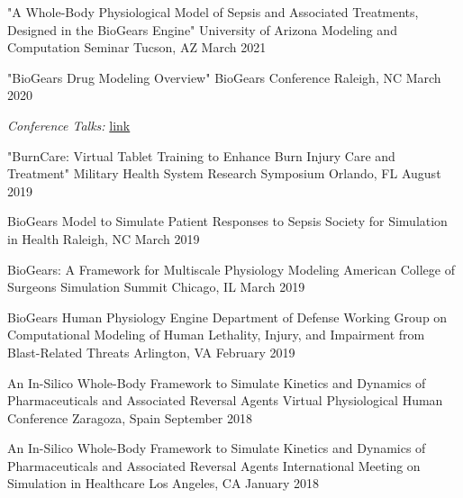 
\begin{cventries}

  \cventry
    {"A Whole-Body Physiological Model of Sepsis and Associated Treatments, Designed in the
BioGears Engine"} %
    {University of Arizona Modeling and Computation Seminar} %
    {Tucson, AZ} %
    {March 2021} %
     {
     }

  \cventry
    {"BioGears Drug Modeling Overview"} %
    {BioGears Conference} %
    {Raleigh, NC} %
    {March 2020} %
     {
    \begin{cvitems} %
    \item {\textit{Conference Talks:} \href{https://www.youtube.com/channel/UCJB9TkmUbLyyXEFc4waJzDg}{link}}
    \end{cvitems}
     }

  \cventry
    {"BurnCare: Virtual Tablet Training to Enhance Burn Injury Care and Treatment"} %
    {Military Health System Research Symposium} %
    {Orlando, FL} %
    {August 2019} %
     {
     }

  \cventry
    {BioGears Model to Simulate Patient Responses to Sepsis} %
    {Society for Simulation in Health} %
    {Raleigh, NC} %
    {March 2019} %
    {
    }

  \cventry
    {BioGears: A Framework for Multiscale Physiology Modeling} %
    {American College of Surgeons Simulation Summit} %
    {Chicago, IL} %
    {March 2019} %
    {
    }

  \cventry
    {BioGears Human Physiology Engine} %
    {Department of Defense Working Group on Computational Modeling of Human Lethality, Injury, and Impairment from Blast-Related Threats} %
    {Arlington, VA} %
    {February 2019} %
    {
    }

  \cventry
    {An In-Silico Whole-Body Framework to Simulate Kinetics and Dynamics of Pharmaceuticals and Associated Reversal Agents} %
    {Virtual Physiological Human Conference} %
    {Zaragoza, Spain} %
    {September 2018} %
    {
    }

  \cventry
    {An In-Silico Whole-Body Framework to Simulate Kinetics and Dynamics of Pharmaceuticals and Associated Reversal Agents} %
    {International Meeting on Simulation in Healthcare} %
    {Los Angeles, CA} %
    {January 2018} %
    {
    }


\end{cventries}
